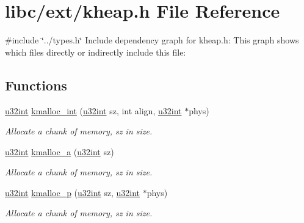 \hypertarget{a00065}{}\section{libc/ext/kheap.h File Reference}
\label{a00065}
{\ttfamily \#include \char`\"{}../types.\+h\char`\"{}}\newline
Include dependency graph for kheap.\+h\+:
This graph shows which files directly or indirectly include this file\+:
\subsection*{Functions}
\begin{DoxyCompactItemize}
\item 
\hyperlink{a00116_a7ae3a26c17ddfe117c6291739780801d_a7ae3a26c17ddfe117c6291739780801d}{u32int} \hyperlink{a00065_a8b976e8a7e805ef85fcfa68b9b9bbd63_a8b976e8a7e805ef85fcfa68b9b9bbd63}{kmalloc\+\_\+int} (\hyperlink{a00116_a7ae3a26c17ddfe117c6291739780801d_a7ae3a26c17ddfe117c6291739780801d}{u32int} sz, int align, \hyperlink{a00116_a7ae3a26c17ddfe117c6291739780801d_a7ae3a26c17ddfe117c6291739780801d}{u32int} $\ast$phys)
\begin{DoxyCompactList}\small\item\em Allocate a chunk of memory, sz in size. \end{DoxyCompactList}\item 
\hyperlink{a00116_a7ae3a26c17ddfe117c6291739780801d_a7ae3a26c17ddfe117c6291739780801d}{u32int} \hyperlink{a00065_a2f7fc26d2604f7bd8bd6d4fac5c98f16_a2f7fc26d2604f7bd8bd6d4fac5c98f16}{kmalloc\+\_\+a} (\hyperlink{a00116_a7ae3a26c17ddfe117c6291739780801d_a7ae3a26c17ddfe117c6291739780801d}{u32int} sz)
\begin{DoxyCompactList}\small\item\em Allocate a chunk of memory, sz in size. \end{DoxyCompactList}\item 
\hyperlink{a00116_a7ae3a26c17ddfe117c6291739780801d_a7ae3a26c17ddfe117c6291739780801d}{u32int} \hyperlink{a00065_ac688411503d5934c65d6c5c1ef204d81_ac688411503d5934c65d6c5c1ef204d81}{kmalloc\+\_\+p} (\hyperlink{a00116_a7ae3a26c17ddfe117c6291739780801d_a7ae3a26c17ddfe117c6291739780801d}{u32int} sz, \hyperlink{a00116_a7ae3a26c17ddfe117c6291739780801d_a7ae3a26c17ddfe117c6291739780801d}{u32int} $\ast$phys)
\begin{DoxyCompactList}\small\item\em Allocate a chunk of memory, sz in size. \end{DoxyCompactList}\item 

\end{DoxyCompactItemize}
